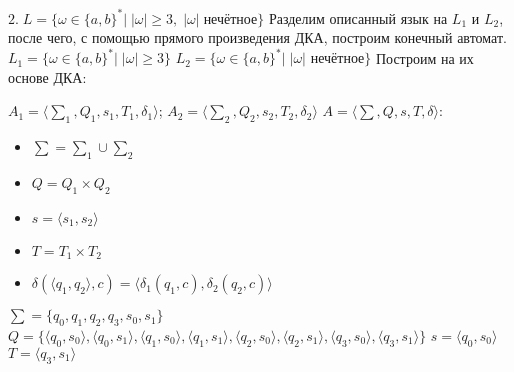 \documentclass[a4paper,12pt]{article}
\begin{document}
\newline
\endgroup
\Large $2.\;L = {\{\omega \in \{a,b\}^*|\;|\omega| \ge 3,\;|\omega| \; \text{нечётное}\}}$\newline
Разделим описанный язык на $L_1$ и $L_2$, после чего, с помощью прямого произведения ДКА, построим конечный автомат.\newline
\Large $L_1 = {\{\omega \in \{a,b\}^*|\;|\omega| \ge 3\}}$\newline
\Large $L_2 = {\{\omega \in \{a,b\}^*|\;|\omega| \text{ нечётное} \}}$\newline
Построим на их основе ДКА:\newline
\begin{center}
\newline
{}\newline
\end{center}
$A_1 = {\langle\sum_1 , Q_1, s_1, T_1, \delta_1 \rangle}$;
$A_2 = {\langle\sum_2 , Q_2, s_2, T_2, \delta_2 \rangle}$\newline
$A = {\langle\sum , Q, s, T, \delta \rangle}$:
\begin{itemize}
\item $\sum = \sum_1 \cup \sum_2$
\item $Q = Q_1 \times Q_2$
\item $s = \langle s_1 , s_2\rangle$
\item $T = T_1 \times T_2$
\item $\delta(\langle q_1 , q_2\rangle, c) =  \langle \delta_1 (q_1 , c), \delta_2 (q_2, c) \rangle$
\end{itemize}
$\sum = \{q_0, q_1, q_2, q_3, s_0, s_1\}$\newline
\normalsize $Q = \{\langle q_0 , s_0 \rangle ,\langle q_0 , s_1 \rangle ,\langle q_1 , s_0 \rangle , \langle q_1 , s_1 \rangle , \langle q_2 , s_0 \rangle , \langle q_2 , s_1 \rangle , \langle q_3 , s_0 \rangle , \langle q_3 , s_1 \rangle\}$\newline
\Large $s = \langle q_0 , s_0 \rangle$\newline
$T = \langle q_3 , s_1 \rangle$\newline
\end{document}
